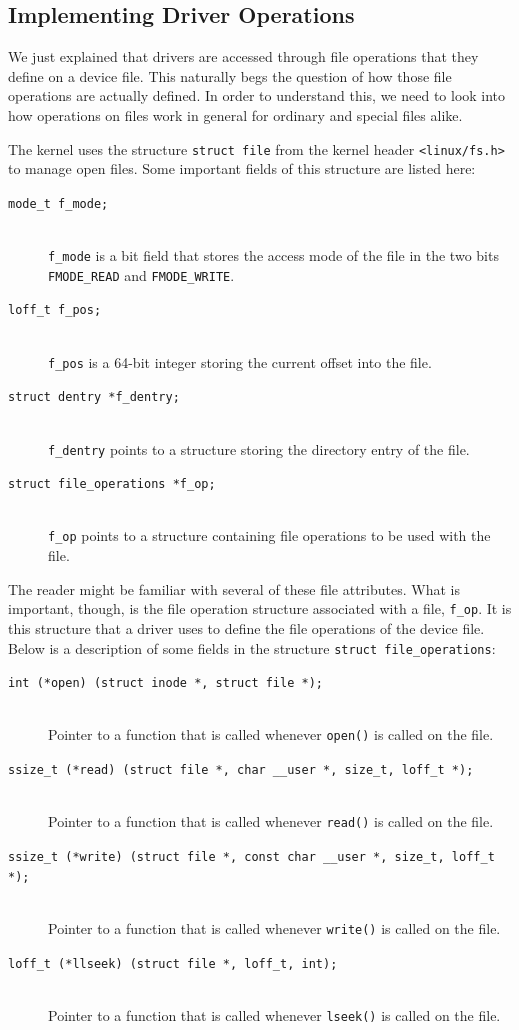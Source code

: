 \subsection{Implementing Driver Operations}
We just explained that drivers are accessed through file operations that they define on a device file. This naturally begs the question of how those file operations are actually defined. In order to understand this, we need to look into how operations on files work in general for ordinary and special files alike.

The kernel uses the structure \texttt{struct file} from the kernel header \texttt{<linux/fs.h>} to manage open files. Some important fields of this structure are listed here:
\begin{description}
  \item[\texttt{mode\_t f\_mode;}] \hfill \\
    \texttt{f\_mode} is a bit field that stores the access mode of the file in the two bits \texttt{FMODE\_READ} and \texttt{FMODE\_WRITE}.
  \item[\texttt{loff\_t f\_pos;}] \hfill \\
    \texttt{f\_pos} is a 64-bit integer storing the current offset into the file.
  \item[\texttt{struct dentry *f\_dentry;}] \hfill \\
    \texttt{f\_dentry} points to a structure storing the directory entry of the file.   
  \item[\texttt{struct file\_operations *f\_op;}] \hfill \\
    \texttt{f\_op} points to a structure containing file operations to be used with the file.
\end{description}
The reader might be familiar with several of these file attributes. What is important, though, is the file operation structure associated with a file, \texttt{f\_op}. It is this structure that a driver uses to define the file operations of the device file. Below is a description of some fields in the structure \texttt{struct file\_operations}:
\begin{description}
  \item[\texttt{int (*open) (struct inode *, struct file *);}] \hfill \\
    Pointer to a function that is called whenever \texttt{open()} is called on the file.
  \item[\texttt{ssize\_t (*read) (struct file *, char \_\_user *, size\_t, loff\_t *);}] \hfill \\
    Pointer to a function that is called whenever \texttt{read()} is called on the file.
  \item[\texttt{ssize\_t (*write) (struct file *, const char \_\_user *, size\_t, loff\_t *);}] \hfill \\
    Pointer to a function that is called whenever \texttt{write()} is called on the file.
  \item[\texttt{loff\_t (*llseek) (struct file *, loff\_t, int);}] \hfill \\
    Pointer to a function that is called whenever \texttt{lseek()} is called on the file.
\end{description}
